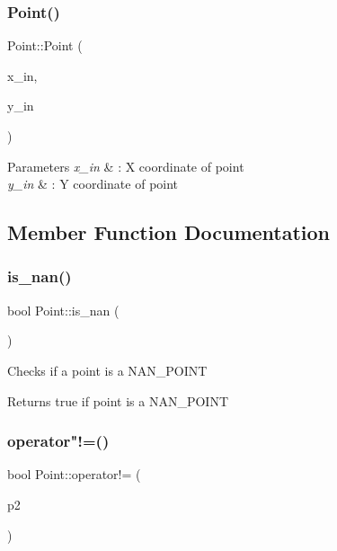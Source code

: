 \subsubsection{\texorpdfstring{Point()}{Point()}\hspace{0.1cm}{\footnotesize\ttfamily [2/2]}}
{\footnotesize\ttfamily Point\+::\+Point (\begin{DoxyParamCaption}\item[{coordinate}]{x\+\_\+in,  }\item[{coordinate}]{y\+\_\+in }\end{DoxyParamCaption})}


\begin{DoxyParams}{Parameters}
{\em x\+\_\+in} & \+: X coordinate of point \\
\hline
{\em y\+\_\+in} & \+: Y coordinate of point \\
\hline
\end{DoxyParams}


\subsection{Member Function Documentation}
\mbox{\label{classPoint_a2bc8aed929f6be2b543ba2f26b8a5f72}} 
\subsubsection{\texorpdfstring{is\+\_\+nan()}{is\_nan()}}
{\footnotesize\ttfamily bool Point\+::is\+\_\+nan (\begin{DoxyParamCaption}{ }\end{DoxyParamCaption})}

Checks if a point is a N\+A\+N\+\_\+\+P\+O\+I\+NT \begin{DoxyReturn}{Returns}
true if point is a N\+A\+N\+\_\+\+P\+O\+I\+NT 
\end{DoxyReturn}
\mbox{\label{classPoint_ade5f3908ec0e412aea8c3e12f5d0e26f}} 
\subsubsection{\texorpdfstring{operator"!=()}{operator!=()}}
{\footnotesize\ttfamily bool Point\+::operator!= (\begin{DoxyParamCaption}\item[{const \hyperlink{classPoint}{Point} \&}]{p2 }\end{DoxyParamCaption})}


